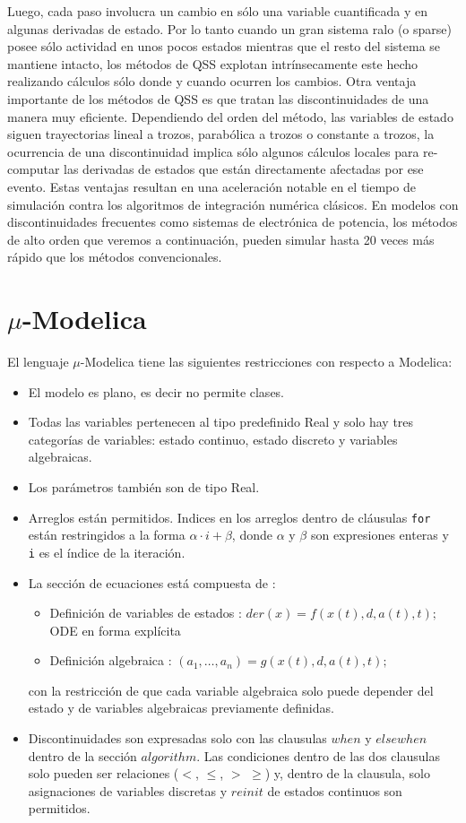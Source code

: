 	Luego, cada paso involucra un cambio en sólo una variable cuantificada y en algunas derivadas de estado. 
	Por lo tanto cuando un gran sistema ralo (o sparse) posee sólo actividad en unos pocos estados mientras que el resto del sistema se mantiene 
	intacto, los métodos de QSS explotan intrínsecamente este hecho realizando cálculos sólo donde y cuando ocurren los cambios.
	Otra ventaja importante de los métodos de QSS es que tratan las discontinuidades de una manera muy eficiente. Dependiendo del orden del método, 
	las variables de estado siguen trayectorias lineal a trozos, parabólica a trozos o constante a trozos, la ocurrencia de una discontinuidad implica 
	sólo algunos cálculos locales para re-computar las derivadas de estados que están directamente afectadas por ese evento.
	Estas ventajas resultan en una aceleración notable en el tiempo de simulación contra los algoritmos de integración numérica clásicos. 
	En modelos con discontinuidades frecuentes como sistemas de electrónica de potencia, los métodos de alto orden que veremos a continuación, 
	pueden simular hasta 20 veces más rápido que los métodos convencionales.


\section{$\mu$-Modelica}
	El lenguaje $\mu$-Modelica\cite{Ber12} tiene las siguientes restricciones con respecto a Modelica:

	\begin{itemize}
	 \item El modelo es plano, es decir no permite clases.
	 \item Todas las variables pertenecen al tipo predefinido Real y solo hay tres categorías de variables: estado continuo, estado discreto y variables 
	algebraicas.
	 \item Los parámetros también son de tipo Real. 
	 \item Arreglos están permitidos. Indices en los arreglos dentro de cláusulas \texttt{for} están restringidos a la forma $\alpha \cdot i + \beta$, 
	donde $\alpha$ y $\beta$ son expresiones enteras y \texttt{i} es el índice de la iteración.
	 \item La sección de ecuaciones está compuesta de :
	 \begin{itemize}
		\item Definición de variables de estados : $der(x) =  f (x(t), d, a(t), t);$ ODE en forma explícita
		\item Definición algebraica : $(a_1 , \dots , a_n ) = g(x(t), d, a(t), t);$
	 \end{itemize}
	 con la restricción de que cada variable algebraica solo puede depender del estado y de variables algebraicas previamente definidas.
	 
	 \item Discontinuidades son expresadas solo con las clausulas $when$ y $elsewhen$ dentro de la sección $algorithm$. Las condiciones dentro de las dos 
	clausulas solo pueden ser relaciones ($<$, $\leqslant$, $>$ $\geqslant$) y, dentro de la clausula, solo asignaciones de variables discretas y $reinit$ 
	de estados continuos son permitidos.
	\end{itemize}

